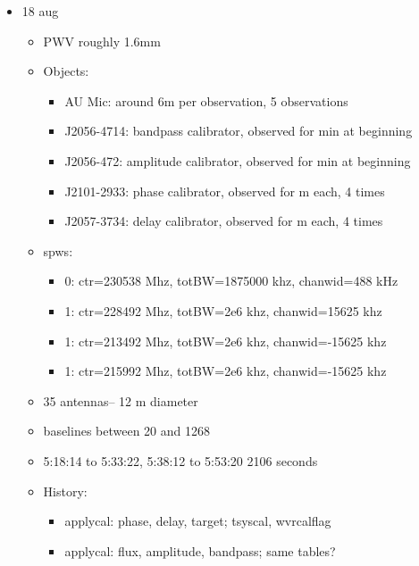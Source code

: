 \documentclass[a4paper]{tufte-handout}
\begin{document}
\begin{itemize}
	\item 18 aug
	      \begin{itemize}
	      	\item PWV roughly 1.6mm
	      	\item Objects:
	      	      \begin{itemize}
	      	      	\item AU Mic: around 6m per observation, 5 observations
	      	      	\item J2056-4714: bandpass calibrator, observed for  min at beginning
	      	      	\item J2056-472: amplitude calibrator, observed for  min at beginning
	      	      	\item J2101-2933: phase calibrator, observed for  m each, 4 times
	      	      	\item J2057-3734: delay calibrator, observed for  m each, 4 times
	      	      \end{itemize}
	      	\item spws:
	      	      \begin{itemize}
	      	      	\item 0: ctr=230538 Mhz, totBW=1875000 khz, chanwid=488 kHz
	      	      	\item 1: ctr=228492 Mhz, totBW=2e6 khz, chanwid=15625 khz
	      	      	\item 1: ctr=213492 Mhz, totBW=2e6 khz, chanwid=-15625 khz
	      	      	\item 1: ctr=215992 Mhz, totBW=2e6 khz, chanwid=-15625 khz
	      	      \end{itemize}
	      	\item 35 antennas-- 12 m diameter
	      	\item baselines between 20 and 1268
	      	\item 5:18:14 to 5:33:22, 5:38:12 to 5:53:20 2106 seconds
          \item History:
          \begin{itemize}
            \item applycal: phase, delay, target; tsyscal, wvrcalflag
            \item applycal: flux, amplitude, bandpass; same tables?
          \end{itemize}
	      \end{itemize}


\end{itemize}
\end{document}
